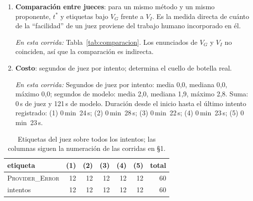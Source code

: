 \documentclass[11pt,a4paper]{article}
\begin{document}
\begin{enumerate}
  \item \textbf{Comparación entre jueces}: para un mismo método y un mismo proponente, $t^*$ y etiquetas bajo $V_G$ frente a $V_I$. Es la medida directa de cuánto de la ``facilidad'' de un juez proviene del trabajo humano incorporado en él.

  \emph{En esta corrida:} Tabla~\ref{tab:comparacion}. Los enunciados de $V_G$ y $V_I$ no coinciden, así que la comparación es indirecta.

  \item \textbf{Costo}: segundos de juez por intento; determina el cuello de botella real.

  \emph{En esta corrida:} Segundos de juez por intento: media 0{,}0, mediana 0{,}0, máximo 0{,}0; segundos de modelo: media 2{,}0, mediana 1{,}9, máximo 2{,}8. Suma: 0\,s de juez y 121\,s de modelo. Duración desde el inicio hasta el último intento registrado: (1) 0\,min~24\,s; (2) 0\,min~28\,s; (3) 0\,min~22\,s; (4) 0\,min~23\,s; (5) 0\,min~23\,s.

\end{enumerate}

\begin{table}[!ht]
\centering
\footnotesize
\begin{tabular}{@{}lrrrrrr@{}}
\toprule
etiqueta & (1) & (2) & (3) & (4) & (5) & total \\
\midrule
\textsc{Provider\_Error} & 12 & 12 & 12 & 12 & 12 & 60 \\
intentos & 12 & 12 & 12 & 12 & 12 & 60 \\
\bottomrule
\end{tabular}
\caption{Etiquetas del juez sobre todos los intentos; las columnas siguen la numeración de las corridas en §1.}
\label{tab:etiquetas}
\end{table}
\end{document}
